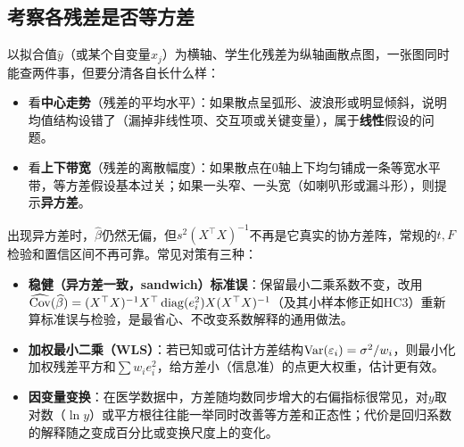 \subsection{考察各残差是否等方差}
以拟合值$\widehat y$（或某个自变量$x_j$）为横轴、学生化残差为纵轴画散点图，一张图同时能查两件事，但要分清各自长什么样：
\begin{itemize}
\item 看\textbf{中心走势}（残差的平均水平）：如果散点呈弧形、波浪形或明显倾斜，说明均值结构设错了（漏掉非线性项、交互项或关键变量），属于\textbf{线性}假设的问题。
\item 看\textbf{上下带宽}（残差的离散幅度）：如果散点在0轴上下均匀铺成一条等宽水平带，等方差假设基本过关；如果一头窄、一头宽（如喇叭形或漏斗形），则提示\textbf{异方差}。
\end{itemize}
出现异方差时，$\widehat\beta$仍然无偏，但$s^2(X^\top X)^{-1}$不再是它真实的协方差阵，常规的$t,F$检验和置信区间不再可靠。常见对策有三种：
\begin{itemize}
\item \textbf{稳健（异方差一致，sandwich）标准误}：保留最小二乘系数不变，改用$\widehat{\operatorname{Cov}}(\widehat\beta)=(X^\top X)^{-1}X^\top\operatorname{diag}(e_i^2)X(X^\top X)^{-1}$（及其小样本修正如HC3）重新算标准误与检验，是最省心、不改变系数解释的通用做法。
\item \textbf{加权最小二乘（WLS）}：若已知或可估计方差结构$\operatorname{Var}(\varepsilon_i)=\sigma^2/w_i$，则最小化加权残差平方和$\sum w_ie_i^2$，给方差小（信息准）的点更大权重，估计更有效。
\item \textbf{因变量变换}：在医学数据中，方差随均数同步增大的右偏指标很常见，对$y$取对数（$\ln y$）或平方根往往能一举同时改善等方差和正态性；代价是回归系数的解释随之变成百分比或变换尺度上的变化。
\end{itemize}
\noindent\begin{minipage}{.49\linewidth}\begin{center}
\end{center}
\end{minipage}
